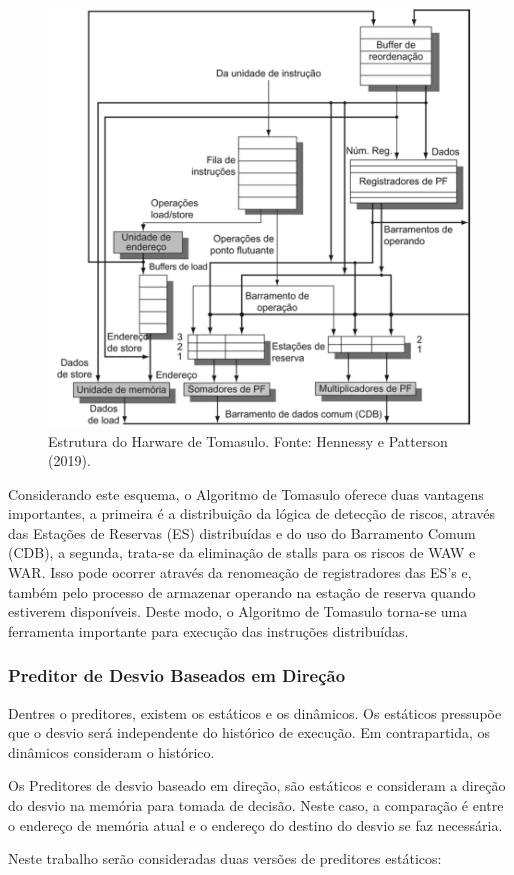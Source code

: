 \documentclass[12pt]{article}
\begin{document}
\begin{figure}[h]
  \centering
  \includegraphics[width=.6\textwidth]{img/fig_tomasulo.png}
  \caption{Estrutura do Harware de Tomasulo. Fonte: Hennessy e Patterson (2019).}
  \label{fig_tomasulo}
\end{figure}


Considerando este esquema, o Algoritmo de Tomasulo oferece duas vantagens importantes, a primeira é a distribuição da lógica de detecção de riscos, através das Estações de Reservas (ES) distribuídas e do uso do Barramento Comum (CDB), a segunda, trata-se da eliminação de stalls para os riscos de WAW e WAR. Isso pode ocorrer através da renomeação de registradores das ES's e, também pelo processo de armazenar operando na estação de reserva quando estiverem disponíveis. Deste modo, o Algoritmo de Tomasulo torna-se uma ferramenta importante para execução das instruções distribuídas.

\subsubsection{Preditor de Desvio Baseados em Direção} \label{sec:secao_desvio}

Dentres o preditores, existem os estáticos e os dinâmicos. Os estáticos pressupõe que o desvio será independente do histórico de execução. Em contrapartida, os dinâmicos consideram o histórico.

Os Preditores de desvio baseado em direção, são estáticos e consideram a direção do desvio na memória para tomada de decisão. Neste caso, a comparação é entre o endereço de memória atual e o endereço do destino do desvio se faz necessária.

Neste trabalho serão consideradas duas versões de preditores estáticos:
\end{document}
